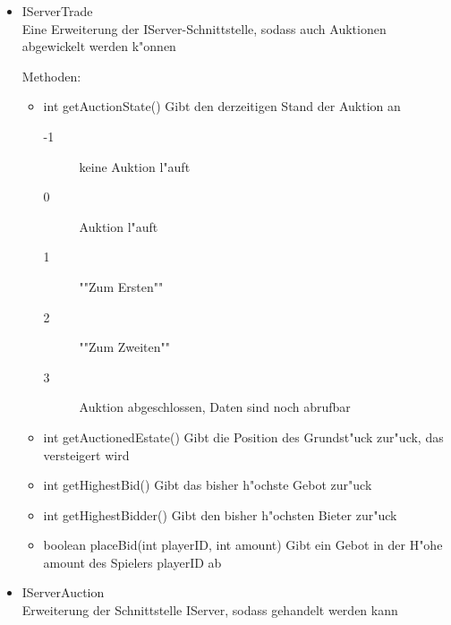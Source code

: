 \documentclass[a4paper,10pt]{article}
\begin{document}
\begin{itemize}
\item IServerTrade \\
Eine Erweiterung der IServer-Schnittstelle, sodass auch Auktionen abgewickelt werden k"onnen

Methoden:
\begin{itemize}
\item int getAuctionState()
Gibt den derzeitigen Stand der Auktion an
\begin{description}
\item[-1] keine Auktion l"auft
\item[0] Auktion l"auft
\item[1] ""Zum Ersten""
\item[2] ""Zum Zweiten""
\item[3] Auktion abgeschlossen, Daten sind noch abrufbar
\end{description}
\item int getAuctionedEstate()
Gibt die Position des Grundst"uck zur"uck, das versteigert wird
\item int getHighestBid()
Gibt das bisher h"ochste Gebot zur"uck
\item int getHighestBidder()
Gibt den bisher h"ochsten Bieter zur"uck
\item boolean placeBid(int playerID, int amount)
Gibt ein Gebot in der H"ohe amount des Spielers playerID ab
\end{itemize}
\item IServerAuction \\
Erweiterung der Schnittstelle IServer, sodass gehandelt werden kann


\end{itemize}
\end{document}
